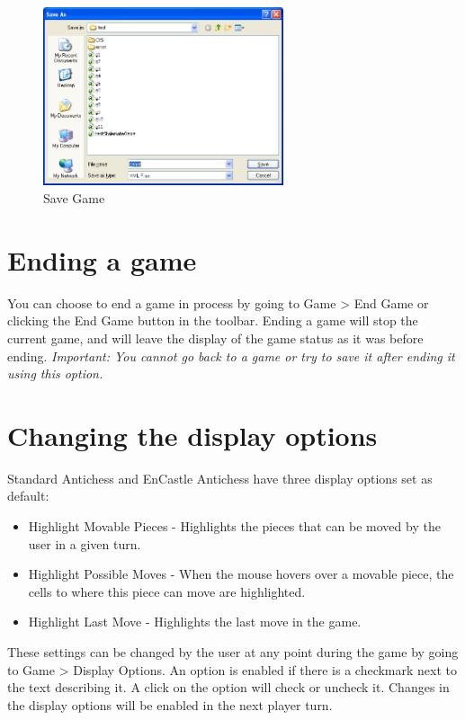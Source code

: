 \documentclass{report}
\begin{document}
			\begin{figure}
					\begin{center}
						\includegraphics[width=200pt]{img/save-game.png}
							\caption{Save Game}						
					\end{center}
				\end{figure}
			
			\section{Ending a game}
			
			You can choose to end a game in process by going to Game > End Game or clicking
			the End Game button in the toolbar. Ending a game will stop the current game, and
			will leave the display of the game status as it was before ending. 
			\textit{Important: You cannot go back to a game or try to save it after ending it
			using this option.}
			 
			\section{Changing the display options}
			
			Standard Antichess and EnCastle Antichess have three display options set as default:
			
				\begin{itemize}
					\item Highlight Movable Pieces - Highlights the pieces that can be moved
								by the user in a given turn.
					\item Highlight Possible Moves - When the mouse hovers over a movable 
								piece, the cells to where this piece can move are highlighted.
					\item Highlight Last Move - Highlights the last move in the game.
				\end{itemize}
			 
			These settings can be changed by the user at any point during the game by going 
			to Game > Display Options. An option is enabled if there is a checkmark next
			to the text describing it. A click on the option will check or uncheck it. 
			Changes in the display options will be enabled in the next player turn.
			
\end{document}
